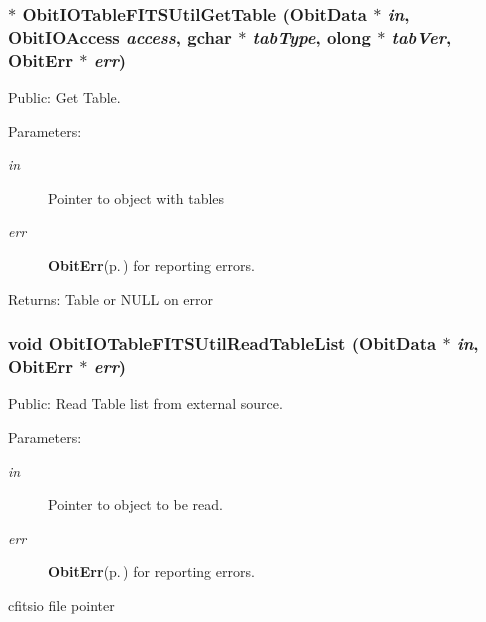 \subsubsection{$\ast$ Obit\-IOTable\-FITSUtil\-Get\-Table ({\bf Obit\-Data} $\ast$ {\em in}, Obit\-IOAccess {\em access}, gchar $\ast$ {\em tab\-Type}, {\bf olong} $\ast$ {\em tab\-Ver}, {\bf Obit\-Err} $\ast$ {\em err})}\label{ObitIOTableFITSUtil_8h_a2}


Public: Get Table. 

\begin{Desc}
\item[Parameters:]
\begin{description}
\item[{\em in}]Pointer to object with tables \item[{\em err}]{\bf Obit\-Err}{\rm (p.\,\pageref{structObitErr})} for reporting errors. \end{description}
\end{Desc}
\begin{Desc}
\item[Returns:]Table or NULL on error \end{Desc}
\subsubsection{\setlength{\rightskip}{0pt plus 5cm}void Obit\-IOTable\-FITSUtil\-Read\-Table\-List ({\bf Obit\-Data} $\ast$ {\em in}, {\bf Obit\-Err} $\ast$ {\em err})}\label{ObitIOTableFITSUtil_8h_a0}


Public: Read Table list from external source. 

\begin{Desc}
\item[Parameters:]
\begin{description}
\item[{\em in}]Pointer to object to be read. \item[{\em err}]{\bf Obit\-Err}{\rm (p.\,\pageref{structObitErr})} for reporting errors.\end{description}
\end{Desc}


cfitsio file pointer 
